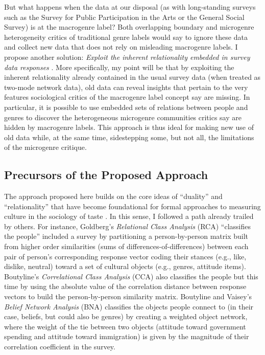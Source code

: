 \documentclass[a4paper,12pt]{extarticle}
\begin{document}
But what happens when the data at our disposal (as with long-standing surveys such as the Survey for Public Participation in the Arts or the General Social Survey) is at the macrogenre label? Both overlapping boundary and microgenre heterogeneity critics of traditional genre labels would say to ignore these data and collect new data that does not rely on misleading macrogenre labels. I propose another solution: {\em Exploit the inherent relationality embedded in survey data responses} \citep{goldberg2011mapping, boutyline2017belief, lizardo18}. More specifically, my point will be that by exploiting the inherent relationality already contained in the usual survey data (when treated as two-mode network data), old data can reveal insights that pertain to the very features sociological critics of the macrogenre label concept say are missing. In particular, it is possible to use embedded sets of relations between people and genres to discover the heterogeneous microgenre communities critics say are hidden by macrogenre labels. This approach is thus ideal for making new use of old data while, at the same time, sidestepping some, but not all, the limitations of the microgenre critique. 	

\subsection{Precursors of the Proposed Approach}
The approach proposed here builds on the core ideas of ``duality'' and ``relationality'' that have become foundational for formal approaches to measuring culture in the sociology of taste \citep{mutzel2020duality, mohr2015formal}. In this sense, I followed a path already trailed by others. For instance, Goldberg's \citeyearpar{goldberg2011mapping} {\em Relational Class Analysis} (RCA) ``classifies the people''  included a survey by partitioning a person-by-person matrix built from higher order similarities (sums of differences-of-differences) between each pair of person's corresponding response vector coding their stances (e.g., like, dislike, neutral) toward a set of cultural objects (e.g., genres, attitude items). Boutyline's \citeyearpar{boutyline2017improving} {\em Correlational Class Analysis} (CCA) also classifies the people but this time by using the absolute value of the correlation distance between response vectors to build the person-by-person similarity matrix. Boutyline and Vaisey's {\em Belief Network Analysis} (BNA) classifies the objects people connect to (in their case, beliefs, but could also be genres) by creating a weighted object network, where the weight of the tie between two objects (attitude toward government spending and attitude toward immigration) is given by the magnitude of their correlation coefficient in the survey. 
\end{document}
